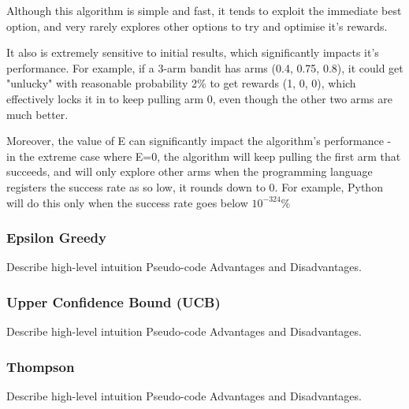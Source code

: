 
Although this algorithm is simple and fast, it tends to exploit the immediate best option, and very rarely explores other options to try and optimise it's rewards.

It also is extremely sensitive to initial results, which significantly impacts it's performance. For example, if a 3-arm bandit has arms (0.4, 0.75, 0.8), it could get "unlucky" with reasonable probability 2\% to get rewards (1, 0, 0), which effectively locks it in to keep pulling arm 0, even though the other two arms are much better.

Moreover, the value of E can significantly impact the algorithm's performance - in the extreme case where E=0, the algorithm will keep pulling the first arm that succeeds, and will only explore other arms when the programming language registers the success rate as so low, it rounds down to 0. For example, Python will do this only when the success rate goes below $10^{-324}\%$

\subsubsection{Epsilon Greedy}
\label{sec:EpsilonGreedy}
Describe high-level intuition
Pseudo-code
Advantages and Disadvantages.

\subsubsection{Upper Confidence Bound (UCB)}
\label{sec:UCB}
Describe high-level intuition
Pseudo-code
Advantages and Disadvantages.

\subsubsection{Thompson}
\label{sec:Thompson}
Describe high-level intuition
Pseudo-code
Advantages and Disadvantages.